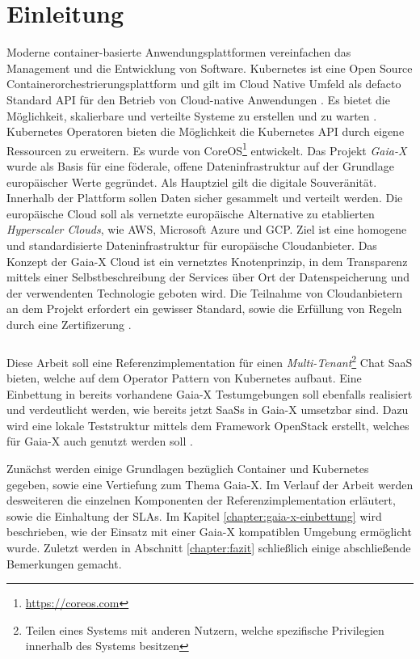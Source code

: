 \chapter{Einleitung}
\label{chap:einleitung}

Moderne container-basierte Anwendungsplattformen vereinfachen das Management und die Entwicklung
von Software. Kubernetes \cite{kubernetes} ist eine Open Source Containerorchestrierungsplattform und gilt im
Cloud Native Umfeld als defacto Standard API für den Betrieb von Cloud-native Anwendungen \cite{Burns2019}.
Es bietet die Möglichkeit, skalierbare und verteilte Systeme zu erstellen und zu warten \cite{Burns2019}.
Kubernetes Operatoren bieten die Möglichkeit die Kubernetes API durch eigene Ressourcen zu erweitern. 
Es wurde von CoreOS\footnote{\url{https://coreos.com}} entwickelt.
Das Projekt \emph{Gaia-X} wurde als Basis für eine föderale, offene Dateninfrastruktur auf der Grundlage europäischer Werte gegründet.
Als Hauptziel gilt die digitale Souveränität. Innerhalb der Plattform sollen Daten sicher gesammelt und verteilt werden.
Die europäische Cloud soll als vernetzte europäische Alternative zu etablierten \emph{Hyperscaler Clouds}, wie \ac{AWS},
Microsoft Azure und \ac{GCP}. Ziel ist eine homogene und standardisierte Dateninfrastruktur für europäische Cloudanbieter.
Das Konzept der Gaia-X Cloud ist ein vernetztes Knotenprinzip, in dem Transparenz mittels einer Selbstbeschreibung der Services
über Ort der Datenspeicherung und der verwendenten Technologie geboten wird.
Die Teilnahme von Cloudanbietern an dem Projekt erfordert ein gewisser Standard, sowie die Erfüllung von Regeln durch eine Zertifizerung \cite{BMWi2019}.

\paragraph{}
Diese Arbeit soll eine Referenzimplementation für einen \emph{Multi-Tenant}\footnote{Teilen eines Systems mit anderen Nutzern, welche spezifische Privilegien innerhalb des Systems besitzen}
Chat \ac{SaaS} bieten, welche auf dem Operator Pattern von Kubernetes aufbaut.
Eine Einbettung in bereits vorhandene Gaia-X Testumgebungen soll ebenfalls realisiert und verdeutlicht werden,
wie bereits jetzt \acp{SaaS} in Gaia-X umsetzbar sind. Dazu wird eine lokale Teststruktur mittels dem Framework OpenStack erstellt,
welches für Gaia-X auch genutzt werden soll \cite{scs}.

Zunächst werden einige Grundlagen bezüglich Container und Kubernetes gegeben, sowie eine Vertiefung zum Thema Gaia-X.
Im Verlauf der Arbeit werden desweiteren die einzelnen Komponenten der Referenzimplementation erläutert, sowie die Einhaltung der \acp{SLA}.
Im Kapitel \ref{chapter:gaia-x-einbettung} wird beschrieben, wie der Einsatz mit einer Gaia-X kompatiblen Umgebung ermöglicht wurde.
Zuletzt werden in Abschnitt \ref{chapter:fazit} schließlich einige abschließende Bemerkungen gemacht.